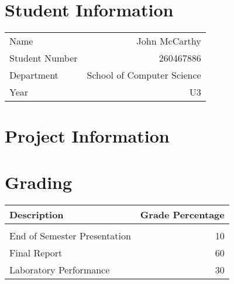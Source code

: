 \begin{multicols}{2}
\section{Student Information}
	
	\sffamily
		\begin{tabular}{l|r}
			Name & John McCarthy \\
			Student Number & 260467886 \\
			Department & School of Computer Science \\
			Year & U3 \\
			\bottomrule
		\end{tabular}
	\normalfont
	
\section{Project Information}

\section{Grading}

	\begin{tabular}{l|r}
			 Description & Grade Percentage \\
		\midrule \\
			End of Semester Presentation & 10 \\
			Final Report	& 60 \\
			Laboratory Performance	& 30 \\
		\bottomrule 
	\end{tabular}
\end{multicols}

